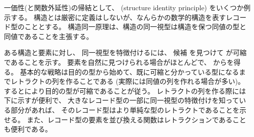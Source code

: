 \documentclass[index]{subfiles}
\begin{document}

一価性(と関数外延性)の帰結として、
(structure identity principle)
をいくつか例示する。
構造とは厳密に定義はしないが、なんらかの数学的構造を表すレコード型のこととする。
構造同一原理は、構造の同一視型は構造を保つ同値の型と同値であることを主張する。

ある構造と要素に対し、
同一視型を特徴付けるには、
候補
を見つけて
が可縮であることを示す。
要素を自然に見つけられる場合がほとんどで、
からを得る。
基本的な戦略は目的の型から始めて、既に可縮と分かっている型になるまでレトラクトの列を作ることである
(実際には同値の列を作れる場合が多い)。
するとにより目的の型が可縮であることが従う。
レトラクトの列を作る際には下に示すが便利で、
大きなレコード型の一部に同一視型の特徴付けを知っている部分があれば、
そのレコード型はより単純な型のレトラクトであることを示せる。
また、レコード型の要素を並び換える関数はレトラクションであることも便利である。







\end{document}
